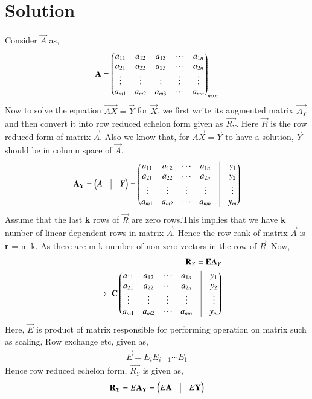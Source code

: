 \documentclass[journal,12pt,twocolumn]{IEEEtran}
\begin{document}
\section{Solution}
Consider $\vec{A}$ as,
\begin{align}
\mathbf{A} = \begin{pmatrix}a_{11}&a_{12}&a_{13}&\cdots&a_{1n}\\a_{21}&a_{22}&a_{23}&\cdots&a_{2n}\\\vdots&\vdots&\vdots&\vdots&\vdots\\a_{m1}&a_{m2}&a_{m3}&\cdots&a_{mn}\end{pmatrix}_{mxn}
\end{align} 
Now to solve the equation $\vec{AX}=\vec{Y}$ for $\vec{X}$, we first write its augmented matrix $\vec{A_Y}$ and then convert it into row reduced echelon form given as $\vec{R_Y}$. Here $\vec{R}$ is the row reduced form of matrix $\vec{A}$. Also we know that, for $\vec{AX}=\vec{Y}$ to have a solution, $\vec{Y}$ should be in column space of $\vec{A}$.
\begin{align}
\vec{A_Y}=\myvec{A&\vrule&Y} = \myvec{a_{11}&a_{12}&\cdots&a_{1n}&\vrule&y_{1} \\a_{21}&a_{22}&\cdots&a_{2n}&\vrule&y_{2}\\\vdots&\vdots&\vdots&\vdots&\vrule&\vdots\\a_{m1}&a_{m2}&\cdots&a_{mn}&\vrule&y_{m}}
\end{align} 
Assume that the last \textbf{k} rows of $\vec{R}$ are zero rows.This implies that we have \textbf{k} number of linear dependent rows in matrix $\vec{A}$. Hence the row rank of matrix $\vec{A}$ is \textbf{r} = m-k. As there are m-k number of non-zero vectors in the row of $\vec{R}$. Now, 
\begin{align}
\vec{R}_{Y} = \vec{EA}_{Y} \\ \implies \vec{C} \myvec{a_{11}&a_{12}&\cdots&a_{1n}&\vrule&y_{1} \\a_{21}&a_{22}&\cdots&a_{2n}&\vrule&y_{2}\\\vdots&\vdots&\vdots&\vdots&\vrule&\vdots\\a_{m1}&a_{m2}&\cdots&a_{mn}&\vrule&y_{m}}
\end{align}
Here, $\vec{E}$ is product of matrix responsible for performing operation on matrix such as scaling, Row exchange etc, given as, 
\begin{align}
\vec{E} = E_iE_{i-1} \cdots E_1
\end{align}
Hence row reduced echelon form, $\vec{R_Y}$ is given as,
\begin{align}
\vec{R_Y} = E\vec{A_Y} = \myvec{E\vec{A}&\vrule&E\vec{Y}}
\end{align}
\end{document}
